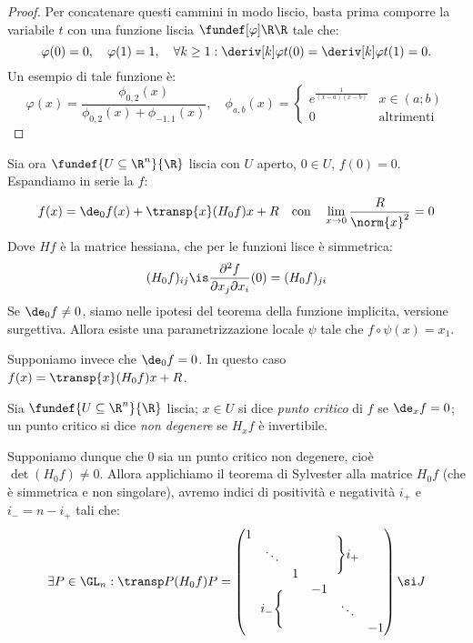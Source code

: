 \begin{proof}
	Per concatenare questi cammini in modo liscio,
	basta prima comporre la variabile $t$ con una funzione liscia $\fundef[\varphi]\R\R$ tale che:
	\[\varphi(0)=0, \quad
	\varphi(1)=1, \quad
	\forall k\ge1:\deriv[k]\varphi t(0)=\deriv[k]\varphi t(1)=0.\]
	Un esempio di tale funzione è:
	\[\varphi(x)=\frac{\phi_{0,2}(x)}{\phi_{0,2}(x)+\phi_{-1,1}(x)},\quad
	\phi_{a,b}(x)=\begin{cases}
		e^{\frac1{(x-a)(x-b)}} & x\in(a;b) \\
		0 & \text{altrimenti}
	\end{cases}\]
\end{proof}

Sia ora $\fundef{U\subseteq\R^n}{\R}$ liscia con $U$ aperto, $0\in U$, $f(0)=0$.
Espandiamo in serie la $f$:
\[f(x)=
\de_0f(x)+\transp{x}(H_0f)x+R
\quad\text{con}\quad
\lim_{x\to0}\frac R{\norm{x}^2}=0\]
Dove $Hf$ è la matrice hessiana, che per le funzioni lisce è simmetrica:
\[(H_0f)_{ij}\is
\frac{\partial^2f}{\partial x_j\partial x_i}(0)=(H_0f)_{ji}\]
Se $\de_0f\neq0$, siamo nelle ipotesi del teorema della funzione implicita, versione surgettiva.
Allora esiste una parametrizzazione locale $\psi$ tale che $f\circ\psi(x)=x_1$.

Supponiamo invece che $\de_0f=0$. In questo caso $f(x)=\transp{x}(H_0f)x+R$.
\begin{defn}
	Sia $\fundef{U\subseteq\R^n}{\R}$ liscia; $x\in U$ si dice \emph{punto critico} di $f$ se $\de_xf=0$; un punto critico si dice \emph{non degenere} se $H_xf$ è invertibile.
\end{defn}

Supponiamo dunque che 0 sia un punto critico non degenere, cioè $\det(H_0f)\neq0$. Allora applichiamo il teorema di Sylvester alla matrice $H_0f$ (che è simmetrica e non singolare), avremo indici di positività e negatività $i_+$ e $i_-=n-i_+$ tali che:
\[\exists P\in\GL_n:
\transp P(H_0f)P=
\begin{pmatrix}
	\begin{matrix}
		1 & & \\
		& \ddots & \\
		& & 1 \\
	\end{matrix} & \Bigg\}i_+ \\
	i_-\Bigg\{ & \begin{matrix}
		-1 & & \\
		& \ddots & \\
		& & -1 \\
	\end{matrix}
\end{pmatrix}\si J\]

